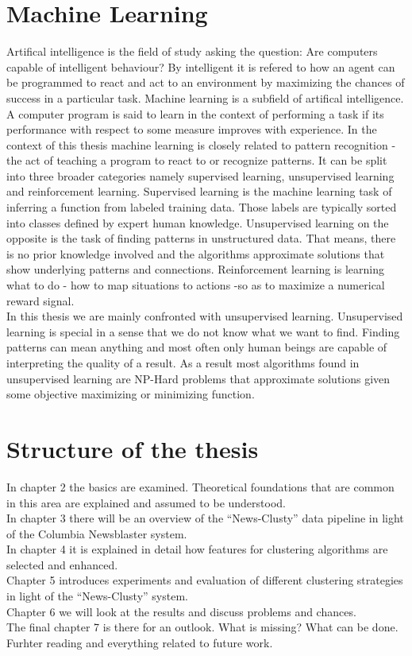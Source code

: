 \section{Machine Learning}
  Artifical intelligence is the field of study asking the question: Are computers capable of intelligent behaviour? By intelligent it is refered to how an agent can be programmed to react and act to an environment by maximizing the chances of success in a particular task. Machine learning is a subfield of artifical intelligence.\\
  A computer program is said to learn in the context of performing a task if its performance with respect to some measure improves with experience. In the context of this thesis machine learning is closely related to pattern recognition - the act of teaching a program to react to or recognize patterns. It can be split into three broader categories namely supervised learning, unsupervised learning and reinforcement learning. Supervised learning is the machine learning task of inferring a function from labeled training data. Those labels are typically sorted into classes defined by expert human knowledge. Unsupervised learning on the opposite is the task of finding patterns in unstructured data. That means, there is no prior knowledge involved and the algorithms approximate solutions that show underlying patterns and connections. Reinforcement learning is learning what to do - how to map situations to actions -so as to maximize a numerical reward signal.\\
  In this thesis we are mainly confronted with unsupervised learning. Unsupervised learning is special in a sense that we do not know what we want to find. Finding patterns can mean anything and most often only human beings are capable of interpreting the quality of a result. As a result most algorithms found in unsupervised learning are NP-Hard problems that approximate solutions given some objective maximizing or minimizing function.

\section{Structure of the thesis}
  In chapter 2 the basics are examined. Theoretical foundations that are common in this area are explained and assumed to be understood.\\
  In chapter 3 there will be an overview of the ``News-Clusty'' data pipeline in light of the Columbia Newsblaster system.\\
  In chapter 4 it is explained in detail how features for clustering algorithms are selected and enhanced.\\
  Chapter 5 introduces experiments and evaluation of different clustering strategies in light of the ``News-Clusty'' system.\\
  Chapter 6 we will look at the results and discuss problems and chances.\\
  The final chapter 7 is there for an outlook. What is missing? What can be done. Furhter reading and everything related to future work.

